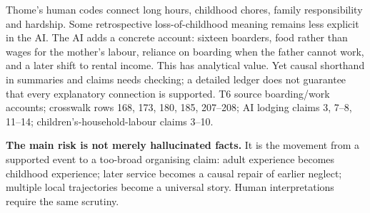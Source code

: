 {Thome's human codes connect long hours, childhood chores, family responsibility and hardship. Some retrospective loss-of-childhood meaning remains less explicit in the AI.}
{The AI adds a concrete account: sixteen boarders, food rather than wages for the mother's labour, reliance on boarding when the father cannot work, and a later shift to rental income. This has analytical value. Yet causal shorthand in summaries and claims needs checking; a detailed ledger does not guarantee that every explanatory connection is supported.}
{T6 source boarding/work accounts; crosswalk rows 168, 173, 180, 185, 207--208; AI lodging claims 3, 7--8, 11--14; children's-household-labour claims 3--10.}

\begin{takeaway}
\textbf{The main risk is not merely hallucinated facts.} It is the movement from a supported event to a too-broad organising claim: adult experience becomes childhood experience; later service becomes a causal repair of earlier neglect; multiple local trajectories become a universal story. Human interpretations require the same scrutiny.
\end{takeaway}
